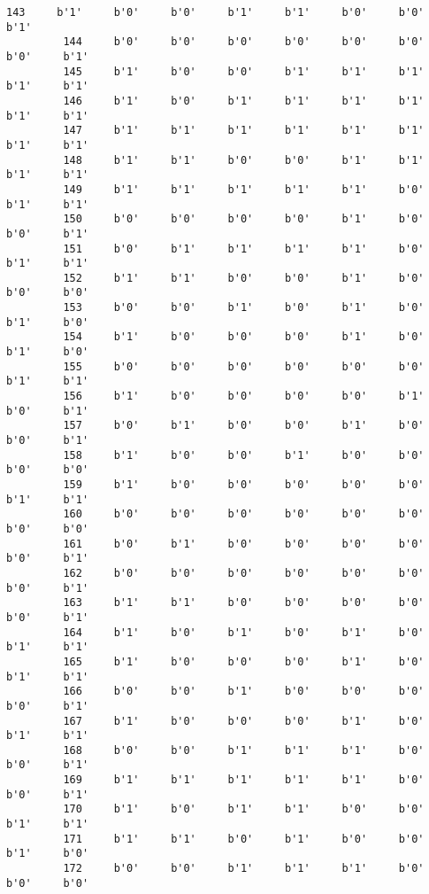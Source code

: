 \documentclass[11pt]{article}
\begin{document}
\begin{Verbatim}[commandchars=\\\{\}]
         143     b'1'     b'0'     b'0'     b'1'     b'1'     b'0'     b'0'     b'1'   
         144     b'0'     b'0'     b'0'     b'0'     b'0'     b'0'     b'0'     b'1'   
         145     b'1'     b'0'     b'0'     b'1'     b'1'     b'1'     b'1'     b'1'   
         146     b'1'     b'0'     b'1'     b'1'     b'1'     b'1'     b'1'     b'1'   
         147     b'1'     b'1'     b'1'     b'1'     b'1'     b'1'     b'1'     b'1'   
         148     b'1'     b'1'     b'0'     b'0'     b'1'     b'1'     b'1'     b'1'   
         149     b'1'     b'1'     b'1'     b'1'     b'1'     b'0'     b'1'     b'1'   
         150     b'0'     b'0'     b'0'     b'0'     b'1'     b'0'     b'0'     b'1'   
         151     b'0'     b'1'     b'1'     b'1'     b'1'     b'0'     b'1'     b'1'   
         152     b'1'     b'1'     b'0'     b'0'     b'1'     b'0'     b'0'     b'0'   
         153     b'0'     b'0'     b'1'     b'0'     b'1'     b'0'     b'1'     b'0'   
         154     b'1'     b'0'     b'0'     b'0'     b'1'     b'0'     b'1'     b'0'   
         155     b'0'     b'0'     b'0'     b'0'     b'0'     b'0'     b'1'     b'1'   
         156     b'1'     b'0'     b'0'     b'0'     b'0'     b'1'     b'0'     b'1'   
         157     b'0'     b'1'     b'0'     b'0'     b'1'     b'0'     b'0'     b'1'   
         158     b'1'     b'0'     b'0'     b'1'     b'0'     b'0'     b'0'     b'0'   
         159     b'1'     b'0'     b'0'     b'0'     b'0'     b'0'     b'1'     b'1'   
         160     b'0'     b'0'     b'0'     b'0'     b'0'     b'0'     b'0'     b'0'   
         161     b'0'     b'1'     b'0'     b'0'     b'0'     b'0'     b'0'     b'1'   
         162     b'0'     b'0'     b'0'     b'0'     b'0'     b'0'     b'0'     b'1'   
         163     b'1'     b'1'     b'0'     b'0'     b'0'     b'0'     b'0'     b'1'   
         164     b'1'     b'0'     b'1'     b'0'     b'1'     b'0'     b'1'     b'1'   
         165     b'1'     b'0'     b'0'     b'0'     b'1'     b'0'     b'1'     b'1'   
         166     b'0'     b'0'     b'1'     b'0'     b'0'     b'0'     b'0'     b'1'   
         167     b'1'     b'0'     b'0'     b'0'     b'1'     b'0'     b'1'     b'1'   
         168     b'0'     b'0'     b'1'     b'1'     b'1'     b'0'     b'0'     b'1'   
         169     b'1'     b'1'     b'1'     b'1'     b'1'     b'0'     b'0'     b'1'   
         170     b'1'     b'0'     b'1'     b'1'     b'0'     b'0'     b'1'     b'1'   
         171     b'1'     b'1'     b'0'     b'1'     b'0'     b'0'     b'1'     b'0'   
         172     b'0'     b'0'     b'1'     b'1'     b'1'     b'0'     b'0'     b'0'   

\end{Verbatim}
\end{document}
